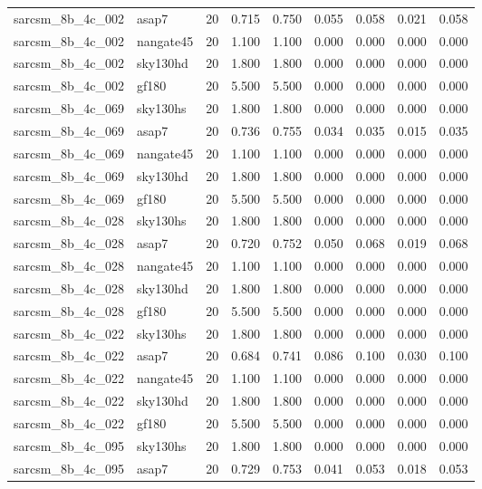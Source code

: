 \begin{tabular}{llrrrrrrr}
sarcsm\_8b\_4c\_002 & asap7 & 20 & 0.715 & 0.750 & 0.055 & 0.058 & 0.021 & 0.058 \\
sarcsm\_8b\_4c\_002 & nangate45 & 20 & 1.100 & 1.100 & 0.000 & 0.000 & 0.000 & 0.000 \\
sarcsm\_8b\_4c\_002 & sky130hd & 20 & 1.800 & 1.800 & 0.000 & 0.000 & 0.000 & 0.000 \\
sarcsm\_8b\_4c\_002 & gf180 & 20 & 5.500 & 5.500 & 0.000 & 0.000 & 0.000 & 0.000 \\
sarcsm\_8b\_4c\_069 & sky130hs & 20 & 1.800 & 1.800 & 0.000 & 0.000 & 0.000 & 0.000 \\
sarcsm\_8b\_4c\_069 & asap7 & 20 & 0.736 & 0.755 & 0.034 & 0.035 & 0.015 & 0.035 \\
sarcsm\_8b\_4c\_069 & nangate45 & 20 & 1.100 & 1.100 & 0.000 & 0.000 & 0.000 & 0.000 \\
sarcsm\_8b\_4c\_069 & sky130hd & 20 & 1.800 & 1.800 & 0.000 & 0.000 & 0.000 & 0.000 \\
sarcsm\_8b\_4c\_069 & gf180 & 20 & 5.500 & 5.500 & 0.000 & 0.000 & 0.000 & 0.000 \\
sarcsm\_8b\_4c\_028 & sky130hs & 20 & 1.800 & 1.800 & 0.000 & 0.000 & 0.000 & 0.000 \\
sarcsm\_8b\_4c\_028 & asap7 & 20 & 0.720 & 0.752 & 0.050 & 0.068 & 0.019 & 0.068 \\
sarcsm\_8b\_4c\_028 & nangate45 & 20 & 1.100 & 1.100 & 0.000 & 0.000 & 0.000 & 0.000 \\
sarcsm\_8b\_4c\_028 & sky130hd & 20 & 1.800 & 1.800 & 0.000 & 0.000 & 0.000 & 0.000 \\
sarcsm\_8b\_4c\_028 & gf180 & 20 & 5.500 & 5.500 & 0.000 & 0.000 & 0.000 & 0.000 \\
sarcsm\_8b\_4c\_022 & sky130hs & 20 & 1.800 & 1.800 & 0.000 & 0.000 & 0.000 & 0.000 \\
sarcsm\_8b\_4c\_022 & asap7 & 20 & 0.684 & 0.741 & 0.086 & 0.100 & 0.030 & 0.100 \\
sarcsm\_8b\_4c\_022 & nangate45 & 20 & 1.100 & 1.100 & 0.000 & 0.000 & 0.000 & 0.000 \\
sarcsm\_8b\_4c\_022 & sky130hd & 20 & 1.800 & 1.800 & 0.000 & 0.000 & 0.000 & 0.000 \\
sarcsm\_8b\_4c\_022 & gf180 & 20 & 5.500 & 5.500 & 0.000 & 0.000 & 0.000 & 0.000 \\
sarcsm\_8b\_4c\_095 & sky130hs & 20 & 1.800 & 1.800 & 0.000 & 0.000 & 0.000 & 0.000 \\
sarcsm\_8b\_4c\_095 & asap7 & 20 & 0.729 & 0.753 & 0.041 & 0.053 & 0.018 & 0.053 \\

\end{tabular}
